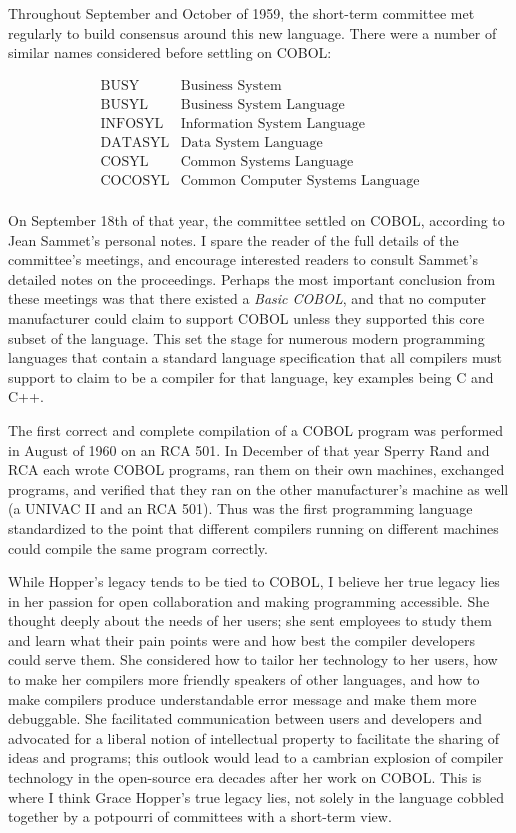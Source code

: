 Throughout September and October of 1959, the short-term committee met
regularly to build consensus around this new language.
There were a number of similar names considered before settling on COBOL:

\[
	\begin{array}{ll}
		\text{BUSY}    & \text{Business System}                  \\
		\text{BUSYL}   & \text{Business System Language}         \\
		\text{INFOSYL} & \text{Information System Language}      \\
		\text{DATASYL} & \text{Data System Language}             \\
		\text{COSYL}   & \text{Common Systems Language}          \\
		\text{COCOSYL} & \text{Common Computer Systems Language} \\
	\end{array}
\]

On September 18th of that year, the committee settled on
COBOL, according to Jean Sammet's personal notes\cite{sammet_early_history_of_cobol_1978}.
I spare the reader of the full details of the committee's meetings,
and encourage interested readers to consult Sammet's detailed notes on the proceedings.
Perhaps the most important conclusion from these meetings was that there existed a
\textit{Basic COBOL}, and that no computer manufacturer could claim to support COBOL
unless they supported this core subset of the language.
This set the stage for numerous modern programming languages that contain a
standard language specification that all compilers must support to claim to
be a compiler for that language, key examples being C and C++.

The first correct and complete compilation of a COBOL program was performed in
August of 1960 on an RCA 501.
In December of that year Sperry Rand and RCA each wrote COBOL programs,
ran them on their own machines, exchanged programs, and verified that they ran on
the other manufacturer's machine as well (a UNIVAC II and an RCA 501).
Thus was the first programming language standardized to the point that different compilers
running on different machines could compile the same program correctly.

While Hopper's legacy tends to be tied to COBOL, I believe her true legacy lies in
her passion for open collaboration and making programming accessible.
She thought deeply about the needs of her users; she sent employees to study them
and learn what their pain points were and how best the compiler developers could serve them.
She considered how to tailor her technology to her users, how to make her compilers
more friendly speakers of other languages, and how to make compilers produce understandable
error message and make them more debuggable.
She facilitated communication between users and developers and advocated for
a liberal notion of intellectual property to facilitate the sharing of ideas and programs;
this outlook would lead to a cambrian explosion of compiler technology in the open-source era
decades after her work on COBOL.
This is where I think Grace Hopper's true legacy lies, not solely in the language
cobbled together by a potpourri of committees with a short-term view.
